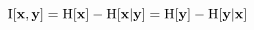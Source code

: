 $$ {\rm I}[{\bf x},{\bf y}] = {\rm H}[{\bf x}] - {\rm H}[{\bf x}|{\bf y}] = {\rm H}[{\bf y}] - {\rm H}[{\bf y}|{\bf x}] $$
